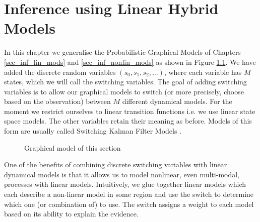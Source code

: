 \chapter{Inference using Linear Hybrid Models}
\label{sec_inf_lin_hybrid}
In this chapter we generalise the Probabilistic Graphical Models of Chapters \ref{sec_inf_lin_mods} and \ref{sec_inf_nonlin_mods} as shown in Figure \ref{fig_hybridmod1}. We have added the discrete random variables $(s_0,s_1, s_2,...)$, where each variable has $M$ states, which we will call the switching variables. The goal of adding switching variables is to allow our graphical models to switch (or more precisely, choose based on the observation) between $M$ different dynamical models. For the moment we restrict ourselves to linear transition functions i.e. we use linear state space models. The other variables retain their meaning as before. Models of this form are usually called Switching Kalman Filter Models \cite{murphy1}. 
\begin{figure}[H] 
\centering
{}
\caption{Graphical model of this section}
\label{fig_hybridmod1}
\end{figure}
One of the benefits of combining discrete switching variables with linear dynamical models is that it allows us to model nonlinear, even multi-modal, processes with linear models. Intuitively, we glue together linear models which each describe a non-linear model in some region and use the switch to determine which one (or combination of) to use. The switch assigns a weight to each model based on its ability to explain the evidence. 

